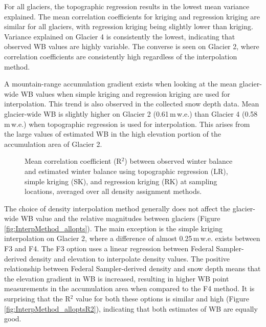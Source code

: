 \documentclass{sfuthesis}
\begin{document}
For all glaciers, the topographic regression results in the lowest mean variance explained. The mean correlation coefficients for kriging and regression kriging are similar for all glaciers, with regression kriging being slightly lower than kriging. Variance explained on Glacier 4 is consistently the lowest, indicating that observed WB values are highly variable. The converse is seen on Glacier 2, where correlation coefficients are consistently high regardless of the interpolation method.

A mountain-range accumulation gradient exists when looking at the mean glacier-wide WB values when simple kriging and regression kriging are used for interpolation. This trend is also observed in the collected snow depth data. Mean glacier-wide WB is slightly higher on Glacier 2 (0.61\,m\,w.e.) than Glacier 4 (0.58\,m\,w.e.) when topographic regression is used for interpolation. This arises from the large values of estimated WB in the high elevation portion of the accumulation area of Glacier 2.

\begin{figure}
	\caption{Mean correlation coefficient (R$^2$) between observed winter balance and estimated winter balance using topographic regression (LR), simple kriging (SK), and regression kriging (RK) at sampling locations, averaged over all density assignment methods.}
	\label{fig:InterpMethod_meanR2}
\end{figure}

The choice of density interpolation method generally does not affect the glacier-wide WB value and the relative magnitudes between glaciers (Figure \ref{fig:InterpMethod_allopts}). The main exception is the simple kriging interpolation on Glacier 2, where a difference of almost 0.25\,m\,w.e. exists between F3 and F4. The F3 option uses a linear regression between Federal Sampler-derived density and elevation to interpolate density values. The positive relationship between Federal Sampler-derived density and snow depth means that the elevation gradient in WB is increased, resulting in higher WB point measurements in the accumulation area when compared to the F4 method.  It is surprising that the R$^2$ value for both these options is similar and high (Figure \ref{fig:InterpMethod_alloptsR2}), indicating that both estimates of WB are equally good.
\end{document}
